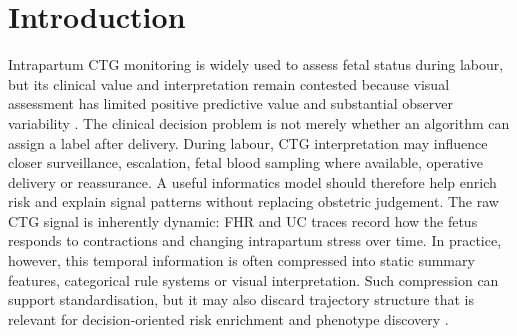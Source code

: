 \documentclass[pdflatex,sn-nature]{sn-jnl}
\begin{document}

\maketitle

\section{Introduction}

Intrapartum CTG monitoring is widely used to assess fetal status during labour, but its clinical value and interpretation remain contested because visual assessment has limited positive predictive value and substantial observer variability \cite{alfirevic2017,figo2015,nichd2008,francis2024}. The clinical decision problem is not merely whether an algorithm can assign a label after delivery. During labour, CTG interpretation may influence closer surveillance, escalation, fetal blood sampling where available, operative delivery or reassurance. A useful informatics model should therefore help enrich risk and explain signal patterns without replacing obstetric judgement. The raw CTG signal is inherently dynamic: FHR and UC traces record how the fetus responds to contractions and changing intrapartum stress over time. In practice, however, this temporal information is often compressed into static summary features, categorical rule systems or visual interpretation. Such compression can support standardisation, but it may also discard trajectory structure that is relevant for decision-oriented risk enrichment and phenotype discovery \cite{mendis2023}.
\end{document}

